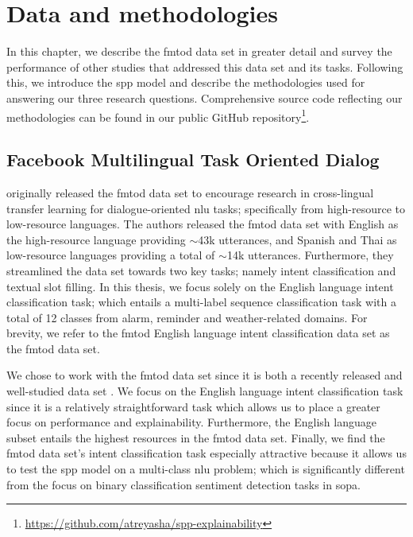 \chapter{Data and methodologies}

\label{chapter:methodologies}

In this chapter, we describe the \ac{fmtod} data set in greater detail and
survey the performance of other studies that addressed this data set and its
tasks. Following this, we introduce the \ac{spp} model and describe the
methodologies used for answering our three research questions. Comprehensive
source code reflecting our methodologies can be found in our public GitHub
repository\footnote{\url{https://github.com/atreyasha/spp-explainability}}.

\section{Facebook Multilingual Task Oriented Dialog}

\citet{schuster-etal-2019-cross-lingual} originally released the \ac{fmtod} data
set to encourage research in cross-lingual transfer learning for
dialogue-oriented \ac{nlu} tasks; specifically from high-resource to
low-resource languages. The authors released the \ac{fmtod} data set with
English as the high-resource language providing $\sim$43k utterances, and
Spanish and Thai as low-resource languages providing a total of $\sim$14k
utterances. Furthermore, they streamlined the data set towards two key tasks;
namely intent classification and textual slot filling. In this thesis, we focus
solely on the English language intent classification task; which entails a
multi-label sequence classification task with a total of 12 classes from alarm,
reminder and weather-related domains. For brevity, we refer to the \ac{fmtod}
English language intent classification data set as the \ac{fmtod} data set.

We chose to work with the \ac{fmtod} data set since it is both a recently released
and well-studied data set
\citep{schuster-etal-2019-cross-lingual,zhang2019joint,zhang-etal-2020-intent}.
We focus on the English language intent classification task since it is a
relatively straightforward task which allows us to place a greater focus on
performance and explainability. Furthermore, the English language subset entails
the highest resources in the \ac{fmtod} data set. Finally, we find the \ac{fmtod} data
set's intent classification task especially attractive because it allows us
to test the \ac{spp} model on a multi-class \ac{nlu} problem; which is significantly
different from the focus on binary classification sentiment detection tasks in
\ac{sopa}. 

